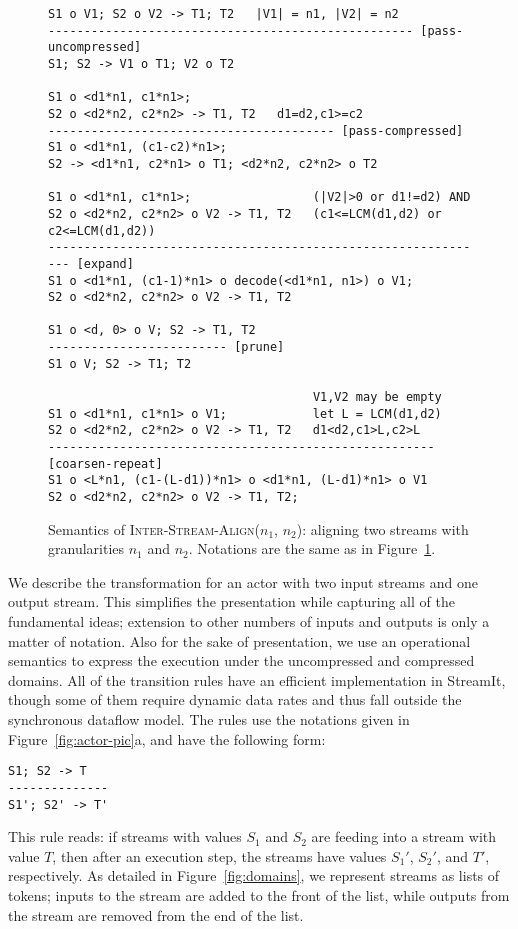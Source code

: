 \begin{figure}[t]
\scriptsize
\begin{verbatim}
S1 o V1; S2 o V2 -> T1; T2   |V1| = n1, |V2| = n2
--------------------------------------------------- [pass-uncompressed]
S1; S2 -> V1 o T1; V2 o T2 

S1 o <d1*n1, c1*n1>; 
S2 o <d2*n2, c2*n2> -> T1, T2   d1=d2,c1>=c2
---------------------------------------- [pass-compressed]
S1 o <d1*n1, (c1-c2)*n1>; 
S2 -> <d1*n1, c2*n1> o T1; <d2*n2, c2*n2> o T2

S1 o <d1*n1, c1*n1>;                 (|V2|>0 or d1!=d2) AND
S2 o <d2*n2, c2*n2> o V2 -> T1, T2   (c1<=LCM(d1,d2) or c2<=LCM(d1,d2))
-------------------------------------------------------------- [expand]
S1 o <d1*n1, (c1-1)*n1> o decode(<d1*n1, n1>) o V1;
S2 o <d2*n2, c2*n2> o V2 -> T1, T2

S1 o <d, 0> o V; S2 -> T1, T2
------------------------- [prune]
S1 o V; S2 -> T1; T2

                                     V1,V2 may be empty
S1 o <d1*n1, c1*n1> o V1;            let L = LCM(d1,d2)
S2 o <d2*n2, c2*n2> o V2 -> T1, T2   d1<d2,c1>L,c2>L
------------------------------------------------------ [coarsen-repeat]
S1 o <L*n1, (c1-(L-d1))*n1> o <d1*n1, (L-d1)*n1> o V1
S2 o <d2*n2, c2*n2> o V2 -> T1, T2;

\end{verbatim}
\caption{Semantics of \textsc{Inter-Stream-Align}($n_1$, $n_2$):
aligning two streams with granularities $n_1$ and $n_2$.  Notations
are the same as in Figure~\ref{fig:inter-stream-align}.
\protect\label{fig:inter-stream-align}}
\end{figure}

We describe the transformation for an actor with two input streams and
one output stream.  This simplifies the presentation while capturing
all of the fundamental ideas; extension to other numbers of inputs and
outputs is only a matter of notation.  Also for the sake of
presentation, we use an operational semantics to express the execution
under the uncompressed and compressed domains.  All of the transition
rules have an efficient implementation in StreamIt, though some of
them require dynamic data rates and thus fall outside the synchronous
dataflow model.  The rules use the notations given in
Figure~\ref{fig:actor-pic}a, and have the following form:

{\scriptsize
\begin{verbatim}
S1; S2 -> T
--------------
S1'; S2' -> T'
\end{verbatim}}
This rule reads: if streams with values $S_1$ and $S_2$ are feeding
into a stream with value $T$, then after an execution step, the
streams have values $S_1'$, $S_2'$, and $T'$, respectively.  As
detailed in Figure~\ref{fig:domains}, we represent streams as lists of
tokens; inputs to the stream are added to the front of the list, while
outputs from the stream are removed from the end of the list.

